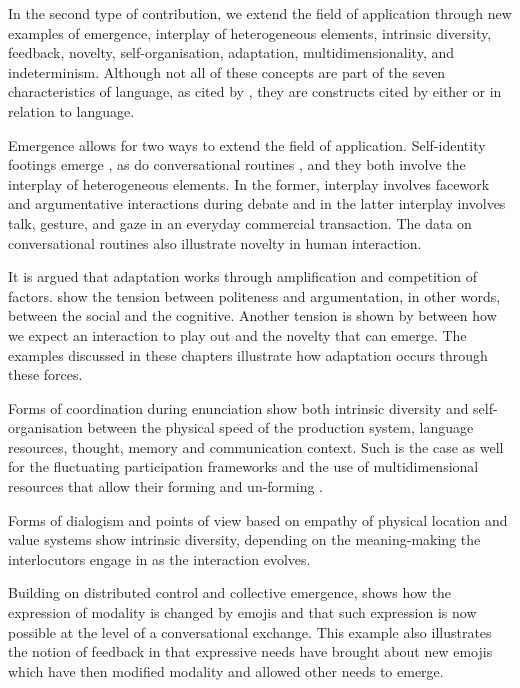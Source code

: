 \documentclass[output=paper]{langscibook}
\begin{document}
\begin{sloppypar}
In the second type of contribution, we extend the field of application through new examples of emergence, interplay of heterogeneous elements, intrinsic diversity, feedback, novelty, self-organisation, adaptation, multidimensionality, and indeterminism. Although not all of these concepts are part of the seven characteristics of language, as cited by \citet{BecknerEtAl2009}, they are constructs cited by either \citet{Kretzschmar2015} or \citet{Massip-Bonet2013} in relation to language.
\end{sloppypar}

Emergence allows for two ways to extend the field of application. Self-identity footings emerge , as do conversational routines , and they both involve the interplay of heterogeneous elements. In the former, interplay involves facework and argumentative interactions during debate and in the latter interplay involves talk, gesture, and gaze in an everyday commercial transaction. The data on conversational routines also illustrate novelty in human interaction.

It is argued that adaptation works through amplification and competition of factors.  show the tension between politeness and argumentation, in other words, between the social and the cognitive. Another tension is shown by  between how we expect an interaction to play out and the novelty that can emerge. The examples discussed in these chapters illustrate how adaptation occurs through these forces.

Forms of coordination during enunciation  show both intrinsic diversity and self-organisation between the physical speed of the production system, language resources, thought, memory and communication context. Such is the case as well for the fluctuating participation frameworks and the use of multidimensional resources that allow their forming and un-forming .

Forms of dialogism  and points of view based on empathy of physical location and value systems  show intrinsic diversity, depending on the meaning-making the interlocutors engage in as the interaction evolves.

Building on distributed control and collective emergence,  shows how the expression of modality is changed by emojis and that such expression is now possible at the level of a conversational exchange. This example also illustrates the notion of feedback in that expressive needs have brought about new emojis which have then modified modality and allowed other needs to emerge.
\end{document}
